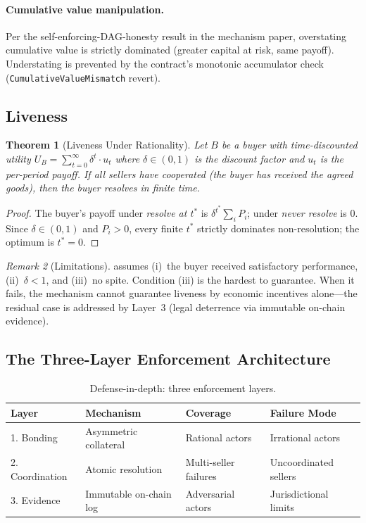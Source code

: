 \documentclass[11pt,a4paper]{article}
\newtheorem{theorem}{Theorem}[section]
\theoremstyle{definition}
\theoremstyle{remark}
\newtheorem{remark}[theorem]{Remark}
\newcommand{\pay}{P}
\begin{document}
\paragraph{Cumulative value manipulation.}
Per the self-enforcing-DAG-honesty result
in the mechanism paper, overstating cumulative value is
strictly dominated (greater capital at risk, same payoff).
Understating is prevented by the contract's monotonic accumulator
check (\texttt{CumulativeValueMismatch} revert).

\subsection{Liveness}

\begin{theorem}[Liveness Under Rationality]
\label{thm:liveness}
Let $B$ be a buyer with time-discounted utility
$U_B = \sum_{t=0}^{\infty} \delta^t \cdot u_t$ where
$\delta \in (0, 1)$ is the discount factor and $u_t$ is the
per-period payoff. If all sellers have cooperated (the buyer has
received the agreed goods), then the buyer resolves in finite time.
\end{theorem}

\begin{proof}
The buyer's payoff under \emph{resolve at $t^*$} is $\delta^{t^*}
\sum_i \pay_i$; under \emph{never resolve} is $0$. Since
$\delta \in (0,1)$ and $\pay_i > 0$, every finite $t^*$ strictly
dominates non-resolution; the optimum is $t^* = 0$.
\end{proof}

\begin{remark}[Limitations]
\label{rem:liveness-limitations}
 assumes (i)~the buyer received satisfactory
performance, (ii)~$\delta < 1$, and (iii)~no spite. Condition (iii)
is the hardest to guarantee. When it fails, the mechanism cannot
guarantee liveness by economic incentives alone---the residual case
is addressed by Layer~3 (legal deterrence via immutable on-chain
evidence).
\end{remark}

\subsection{The Three-Layer Enforcement Architecture}

\begin{table}[ht]
\centering
\caption{Defense-in-depth: three enforcement layers.}
\label{tab:enforcement}
\begin{tabular}{llll}
\toprule
\textbf{Layer} & \textbf{Mechanism} & \textbf{Coverage} & \textbf{Failure Mode} \\
\midrule
1. Bonding & Asymmetric collateral & Rational actors & Irrational actors \\
2. Coordination & Atomic resolution & Multi-seller failures & Uncoordinated sellers \\
3. Evidence & Immutable on-chain log & Adversarial actors & Jurisdictional limits \\
\bottomrule
\end{tabular}
\end{table}
\end{document}
